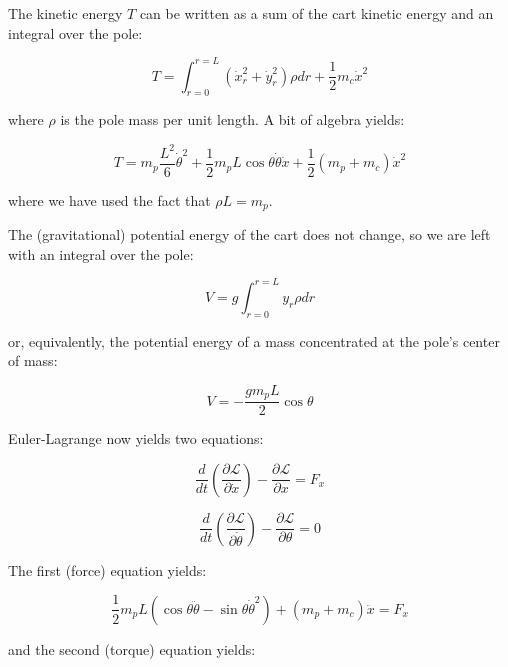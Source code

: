 \documentclass[twoside,11pt]{article}
\begin{document}
The kinetic energy $T$ can be written as a sum of the cart kinetic energy and an integral over the pole:

\begin{equation}
T = \int_{r=0}^{r=L} (\dot{x}_r^2 + \dot{y}_r^2) \rho dr + \frac{1}{2} m_c \dot{x}^2
\end{equation}

where $\rho$ is the pole mass per unit length. A bit of algebra yields:

\begin{equation}
T = m_p \frac{L^2}{6} \dot{\theta}^2 + \frac{1}{2}m_p L \cos{\theta} \dot{\theta} \dot{x} + \frac{1}{2} \left(m_p + m_c\right) \dot{x}^2
\end{equation}

where we have used the fact that $\rho L = m_p$.

The (gravitational) potential energy of the cart does not change, so we are left with an integral over the pole:

\begin{equation}
V = g \int_{r=0}^{r=L} y_r \rho dr
\end{equation}

or, equivalently, the potential energy of a mass concentrated at the pole's center of mass:

\begin{equation}
V = - \frac{g m_p L}{2} \cos{\theta}
\end{equation}

Euler-Lagrange now yields two equations:

\begin{equation}
\frac{d}{dt} \left(\frac{\partial \mathcal{L}}{\partial \dot{x}} \right) - \frac{\partial \mathcal{L}}{\partial x} = F_x
\end{equation}

\begin{equation}
\frac{d}{dt} \left(\frac{\partial \mathcal{L}}{\partial \dot{\theta}} \right) - \frac{\partial \mathcal{L}}{\partial \theta} = 0
\end{equation}

The first (force) equation yields:

\begin{equation}
\frac{1}{2} m_p L \left(\cos{\theta} \ddot{\theta} - \sin{\theta} \dot{\theta}^2 \right) + \left( m_p + m_c\right) \ddot{x} = F_x
\end{equation}

and the second (torque) equation yields:
\end{document}
